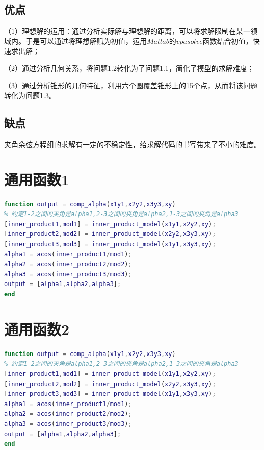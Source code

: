 \documentclass[12pt]{ctexart}
\begin{document}
\begin{spacing}{1.5}
\subsection{优点}
（1）理想解的运用：通过分析实际解与理想解的距离，可以将求解限制在某一领域内。于是可以通过将理想解赋为初值，运用$Matlab$的$vpasolve$函数结合初值，快速求出解；

（2）通过分析几何关系，将问题1.2转化为了问题1.1，简化了模型的求解难度；

（3）通过分析锥形的几何特征，利用六个圆覆盖锥形上的15个点，从而将该问题转化为问题1.3。

\subsection{缺点}
夹角余弦方程组的求解有一定的不稳定性，给求解代码的书写带来了不小的难度。


\newpage

\appendix
{}

\section{通用函数1}
\begin{lstlisting}[title="comp\_alpha.m",language=matlab]
% 代码段
function output = comp_alpha(x1y1,x2y2,x3y3,xy)
% 约定1-2之间的夹角是alpha1,2-3之间的夹角是alpha2,1-3之间的夹角是alpha3
[inner_product1,mod1] = inner_product_model(x1y1,x2y2,xy);
[inner_product2,mod2] = inner_product_model(x2y2,x3y3,xy);
[inner_product3,mod3] = inner_product_model(x1y1,x3y3,xy);
alpha1 = acos(inner_product1/mod1);
alpha2 = acos(inner_product2/mod2);
alpha3 = acos(inner_product3/mod3);
output = [alpha1,alpha2,alpha3];
end
\end{lstlisting}

\section{通用函数2}
\begin{lstlisting}[title="inner\_product\_model.m",language=matlab]
% 代码段
function output = comp_alpha(x1y1,x2y2,x3y3,xy)
% 约定1-2之间的夹角是alpha1,2-3之间的夹角是alpha2,1-3之间的夹角是alpha3
[inner_product1,mod1] = inner_product_model(x1y1,x2y2,xy);
[inner_product2,mod2] = inner_product_model(x2y2,x3y3,xy);
[inner_product3,mod3] = inner_product_model(x1y1,x3y3,xy);
alpha1 = acos(inner_product1/mod1);
alpha2 = acos(inner_product2/mod2);
alpha3 = acos(inner_product3/mod3);
output = [alpha1,alpha2,alpha3];
end
\end{lstlisting}


\end{spacing}
\end{document}
